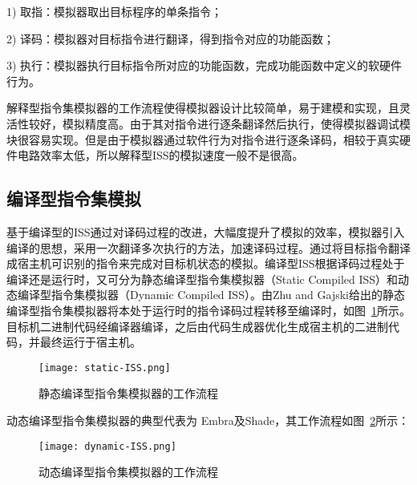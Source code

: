1) 取指：模拟器取出目标程序的单条指令；


2) 译码：模拟器对目标指令进行翻译，得到指令对应的功能函数； 


3) 执行：模拟器执行目标指令所对应的功能函数，完成功能函数中定义的软硬件行为。


解释型指令集模拟器的工作流程使得模拟器设计比较简单，易于建模和实现，且灵活性较好，模拟精度高。由于其对指令进行逐条翻译然后执行，使得模拟器调试模块很容易实现。但是由于模拟器通过软件行为对指令进行逐条译码，相较于真实硬件电路效率太低\cite{gutierrez2014sources}，所以解释型ISS的模拟速度一般不是很高。


\subsection{编译型指令集模拟}
基于编译型的ISS通过对译码过程的改进，大幅度提升了模拟的效率，模拟器引入编译的思想，采用一次翻译多次执行的方法，加速译码过程\cite{李剑慧2007动态二进制翻译与优化技术研究}。通过将目标指令翻译成宿主机可识别的指令来完成对目标机状态的模拟。编译型ISS根据译码过程处于编译还是运行时，又可分为静态编译型指令集模拟器（Static Compiled ISS）和动态编译型指令集模拟器（Dynamic Compiled ISS）。由Zhu and Gajski\cite{zhu1999retargetable}给出的静态编译型指令集模拟器将本处于运行时的指令译码过程转移至编译时，如图~\ref{fig:static-ISS}所示。目标机二进制代码经编译器编译，之后由代码生成器优化生成宿主机的二进制代码，并最终运行于宿主机。
\begin{figure}[h]
  \centering
  \texttt{[image: static-ISS.png]}
  \caption{静态编译型指令集模拟器的工作流程}
  \label{fig:static-ISS}
\end{figure}


动态编译型指令集模拟器的典型代表为 Embra\cite{witchel1996embra}及Shade\cite{cmelik1995shade}，其工作流程如图~\ref{fig:dynamic-ISS}所示：
\begin{figure}[h]
  \centering
  \texttt{[image: dynamic-ISS.png]}
  \caption{动态编译型指令集模拟器的工作流程}
  \label{fig:dynamic-ISS}
\end{figure}



